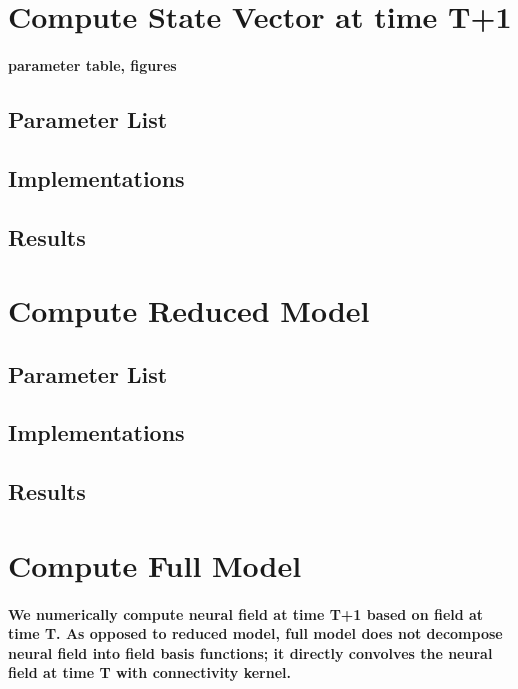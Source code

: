 \documentclass[a4paper, 12pt, english]{article}
\begin{document}
\section{Compute State Vector at time T+1}
\label{state vector}
\paragraph{parameter table, figures}
\subsection{Parameter List}
\subsection{Implementations}
\subsection{Results}
\newpage





\section{Compute Reduced Model}
\subsection{Parameter List}
\subsection{Implementations}
\subsection{Results}

\newpage





\section{Compute Full Model}
\paragraph{We numerically compute neural field at time T+1 based on field at time T.
As opposed to reduced model, full model does not decompose neural field into field basis functions; it directly convolves
the neural field at time T with connectivity kernel.}
\end{document}
